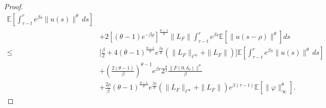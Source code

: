 \documentclass[11pt]{article}
\numberwithin{equation}{section}
\theoremstyle{plain}
\begin{document}
\begin{proof}
\begin{align}
 	         \mathbb{E}
 	                \left[ \int_{\tau-t}^{r} e^{\beta s} \|u(s)\|^{\theta} \, ds
 	               \right]  \nonumber\\
 	  & + 2 [(\theta - 1) e^{-\beta \rho} ]^{\frac{\theta - 1}{\theta} }  \|L_F\|
              \int_{\tau-t}^{r} e^{\beta s} 
                  \mathbb{E} \left[ \|u(s-\rho)\|^{\theta} \right] ds  \nonumber\\
 \le & \Big[ \tfrac{\beta}{2}
 	                + 4(\theta-1)^{\frac{\theta - 1}{\theta} } e^{\frac{\beta \rho}{\theta} }
 	                    \left( \|L_{F}\|_{\ell^\infty} + \|L_F\|
 	                    \right) 
 	       \Big]
 	        \mathbb{E}
 	               \left[ \int_{\tau-t}^{r}
 	                             e^{\beta s} \|u(s)\|^{\theta} \, ds
 	              \right]   \nonumber\\
 	   & + \left( \frac{2(\theta-1)}{\beta} \right)^{\theta-1}
 	           e^{\beta r} 2^{\frac{\theta}{2}} 
 	           \frac{\|F(0,\delta_0)\|^{\theta}}{\beta}   \nonumber\\
 	   & +  \frac{2 \rho}{\beta} 
 	           (\theta - 1)^{\frac{\theta - 1}{\theta} } 
 	           e^{\frac{\beta \rho}{\theta} } 
 	     	   \left( \|L_{F}\|_{\ell^\infty} + \|L_F\| \right)
 	     	    e^{\beta (\tau - t)} 
 	     	    \mathbb{E} \left[ \|\varphi\|_{\infty}^{\theta} \right].
 \end{align}
 

\end{proof}
\end{document}
